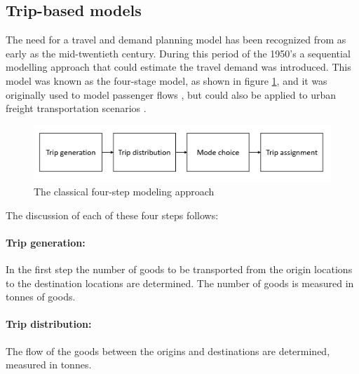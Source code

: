 




\subsection{Trip-based models}

The need for a travel and demand planning model has been recognized from as early as the mid-twentieth century. During this period of the 1950's a sequential modelling approach that could estimate the travel demand was introduced. This model was known as the four-stage model, as shown in figure \ref{fig:four_steps}, and it was originally used to model passenger flows \citep{sivakumar2007modelling}, but could also be applied to urban freight transportation scenarios \citep{deJong2014new}. 

\begin{figure}[h]
    \centering
    \includegraphics{images/four_step_model.PNG}
    \caption{The classical four-step modeling approach}
    \label{fig:four_steps}
\end{figure}

The discussion of each of these four steps follows:
\paragraph{Trip generation:} In the first step the number of goods to be transported from the origin locations to the destination locations are determined. The number of goods is measured in tonnes of goods.

\paragraph{Trip distribution:} The flow of the goods between the origins and destinations are determined, measured in tonnes.


